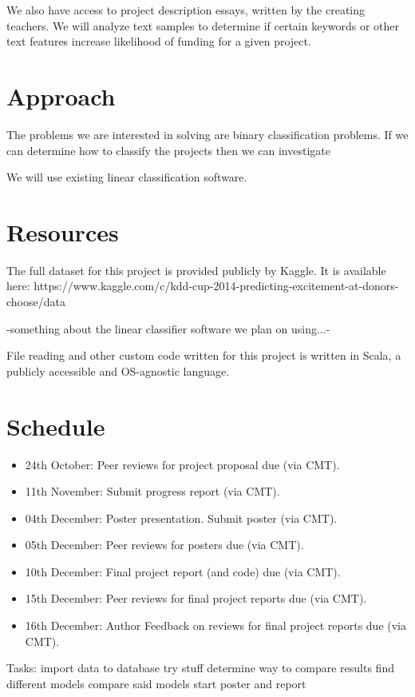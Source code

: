 \documentclass{article}
\begin{document}
We also have access to project description essays, written by the creating teachers. We will analyze text samples to determine if certain keywords or other text features increase likelihood of funding for a given project.
\section{Approach}
The problems we are interested in solving are binary classification problems.  If we can determine how to classify the projects then we can investigate

We will use existing linear classification software.

\section{Resources}
The full dataset for this project is provided publicly by Kaggle. It is available here: https://www.kaggle.com/c/kdd-cup-2014-predicting-excitement-at-donors-choose/data

-something about the linear classifier software we plan on using...-

File reading and other custom code written for this project is written in Scala, a publicly accessible and OS-agnostic language.
\section{Schedule}

\begin{itemize}
\item 24th October: Peer reviews for project proposal due (via CMT).
\item 11th November: Submit progress report (via CMT).
\item 04th December: Poster presentation. Submit poster (via CMT).
\item 05th December: Peer reviews for posters due (via CMT).
\item 10th December: Final project report (and code) due (via CMT).
\item 15th December: Peer reviews for final project reports due (via CMT).
\item 16th December: Author Feedback on reviews for final project reports due (via CMT).
\end{itemize}

Tasks:
import data to database 
try stuff
determine way to compare results 
find different models 
compare said models
start poster and report
 
\end{document}

